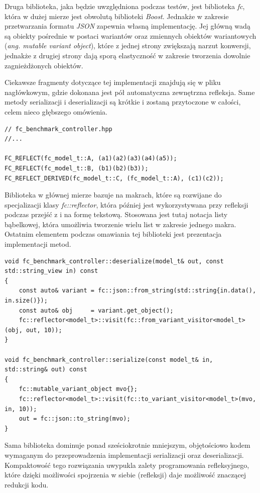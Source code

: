 \documentclass[12pt]{article}
\newcommand{\n}{\newline}
\newcommand{\nonpl}[1]{{\it #1}}
\newcommand{\code}[1]{{\it #1}}
\newcommand{\ang}[1]{\nonpl{ang. #1}}
\newcommand{\JSON}{\nonpl{JSON} }
\begin{document}
{{{				Druga biblioteka, jaka będzie uwzględniona podczas testów, jest biblioteka \nonpl{fc}\cite{fc_repo}, która w dużej mierze jest obwolutą biblioteki
				\nonpl{Boost}\cite{boost}. Jednakże w zakresie przetwarzania formatu \JSON zapewnia własną implementację. Jej główną wadą są obiekty pośrednie
				w postaci wariantów oraz zmiennych obiektów wariantowych (\ang{mutable variant object}), które z jednej strony zwiększają narzut konwersji,
				jednakże z drugiej strony dają sporą elastyczność w zakresie tworzenia dowolnie zagnieżdżonych obiektów.\n

				Ciekawsze fragmenty dotyczące tej implementacji znajdują się w pliku nagłówkowym, gdzie dokonana jest pół automatyczna zewnętrzna refleksja. Same
				metody serializacji i deserializacji są krótkie i zostaną przytoczone w całości, celem nieco głębszego omówienia.\n

				\begin{lstlisting}[frame=single]
// fc_benchmark_controller.hpp
//...

FC_REFLECT(fc_model_t::A, (a1)(a2)(a3)(a4)(a5));
FC_REFLECT(fc_model_t::B, (b1)(b2)(b3));
FC_REFLECT_DERIVED(fc_model_t::C, (fc_model_t::A), (c1)(c2));
				\end{lstlisting}

				Biblioteka w głównej mierze bazuje na makrach, które są rozwijane do specjalizacji klasy \code{fc::reflector}, która później jest
				wykorzystywana przy refleksji podczas przejść z i na formę tekstową. Stosowana jest tutaj notacja listy bąbelkowej, która umożliwia
				tworzenie wielu list w zakresie jednego makra. Ostatnim elementem podczas omawiania tej biblioteki jest prezentacja implementacji metod.\n

				\begin{lstlisting}[frame=single]
void fc_benchmark_controller::deserialize(model_t& out, const std::string_view in) const
{
	const auto& variant = fc::json::from_string(std::string{in.data(), in.size()});
	const auto& obj	    = variant.get_object();
	fc::reflector<model_t>::visit(fc::from_variant_visitor<model_t>(obj, out, 10));
}

void fc_benchmark_controller::serialize(const model_t& in, std::string& out) const
{
	fc::mutable_variant_object mvo{};
	fc::reflector<model_t>::visit(fc::to_variant_visitor<model_t>(mvo, in, 10));
	out = fc::json::to_string(mvo);
}
				\end{lstlisting}

				Sama biblioteka dominuje ponad sześciokrotnie mniejszym, objętościowo kodem wymaganym do przeprowadzenia implementacji
				serializacji oraz deserializacji. Kompaktowość tego rozwiązania uwypukla zalety programowania refleksyjnego, które dzięki
				możliwości spojrzenia w siebie (refleksji) daje możliwość znaczącej redukcji kodu.\n

}}}
\end{document}
